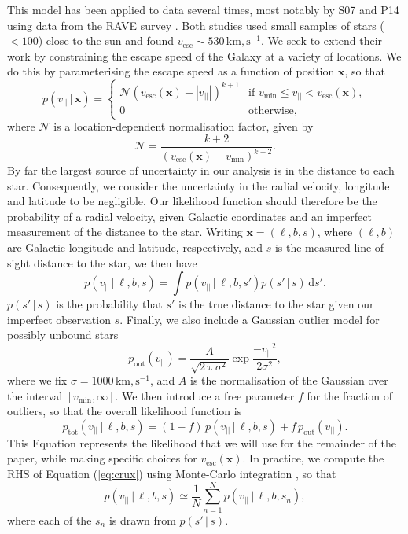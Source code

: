 \documentclass[useAMS,twocolumn,usenatbib]{mn2e}
\def\km,s{{\,\mathrm{km,s^{-1}}}}
\def\vlos{{v_{||}}}
\def\vesc{{v_\mathrm{esc}}}
\def\vmin{{v_\mathrm{min}}}
\def\pos{{\boldsymbol{x}}}
\def\intd{{\mathrm{d}}}
\begin{document}
This model has been applied to data several times, most notably by S07 and P14 using data from the {\sc RAVE} survey \citep{Ko13}. 
Both studies used small samples of stars ($<100$) close to the sun and found $\vesc \sim 530\km,s$. 
We seek to extend their work by constraining the escape speed of the Galaxy at a variety of locations. 
We do this by parameterising the escape speed as a function of position $\pos$, so that
%
\begin{equation}
  p(\vlos \,|\, \pos) = \begin{cases}
    \mathcal{N}(\vesc(\pos) - |\vlos|)^{k+1} & \text{if $\vmin \leq \vlos <\vesc(\pos)$},\\
    0 & \text{otherwise},
  \end{cases}
  \label{eq:model}
\end{equation}
%
where $\mathcal{N}$ is a location-dependent normalisation factor, given by
%
\begin{equation}
\mathcal{N} = \dfrac{k+2}{(\vesc(\pos) - \vmin)^{k+2}}.
\label{eq:norm}
\end{equation}
%
By far the largest source of uncertainty in our analysis is in the distance to each star. 
Consequently, we consider the uncertainty in the radial velocity, longitude and latitude to be negligible. 
Our likelihood function should therefore be the probability of a radial velocity, given Galactic coordinates and an imperfect measurement of the distance to the star. 
Writing $\pos = (\ell, b, s)$, where $(\ell,b)$ are Galactic longitude and latitude, respectively, and $s$ is the measured line of sight distance to the star, we then have
%
\begin{equation}
p(\vlos \,|\, \ell, b, s) = \int p(\vlos \,| \,\ell, b, s' )p(s'\,|\,s)\, \intd s'.
\label{eq:crux}
\end{equation}
%
$p(s'\,|\,s)$ is the probability that $s'$ is the true distance to the star given our imperfect observation $s$. 
Finally, we also include a Gaussian outlier model for possibly unbound stars
%
\begin{equation}
p_\mathrm{out}(\vlos) = \dfrac{A}{\sqrt{2\,\mathrm{\pi}\,\sigma^2}}\exp \dfrac{-\vlos^2}{2\sigma^2},
\end{equation}
%
where we fix $\sigma = 1000\km,s$, and $A$ is the normalisation of the Gaussian over the interval $\left[v_\mathrm{min},\infty\right]$. 
We then introduce a free parameter $f$ for the fraction of outliers, so that the overall likelihood function is
%
\begin{equation}
p_\mathrm{tot}(\vlos \,|\, \ell, b, s) = (1-f)\,p(\vlos \,|\, \ell, b, s) + f\,p_\mathrm{out}(\vlos).
\end{equation}
%
This Equation represents the likelihood that we will use for the remainder of the paper, while making specific choices for $\vesc(\pos)$. 
In practice, we compute the RHS of Equation (\ref{eq:crux}) using Monte-Carlo integration \citep[e.g.][]{Ev16,Bo16}, so that
%
\begin{equation}
p(\vlos \,|\, \ell, b, s) \simeq \dfrac{1}{N}\sum\limits_{n=1}^{N} p(\vlos \,| \,\ell, b, s_n ),
\end{equation}
%
where each of the $s_n$ is drawn from $p(s'\,|\,s)$.
\end{document}
